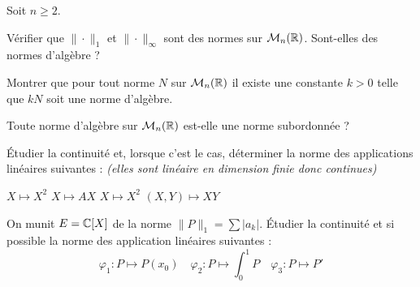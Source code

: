 \documentclass{report}
\begin{document}
\begin{exo}
    Soit \(n\geq 2\).
    \begin{q}{1}
        Vérifier que \(\|\cdot\|_1\) et \(\|\cdot\|_\infty\) sont des normes
        sur \(\mathcal{M}_n(\mathbb{R})\). Sont-elles des normes d'algèbre ?
    \end{q}
    \begin{q}{2}
        Montrer que pour tout norme \(N\) sur \(\mathcal{M}_n(\mathbb{R})\) il existe une
        constante \(k>0\) telle que \(kN\) soit une norme d'algèbre.
    \end{q}
    \begin{q}{3}
        Toute norme d'algèbre sur \(\mathcal{M}_n(\mathbb{R})\) est-elle une norme subordonnée ?
    \end{q}
\end{exo}

\begin{exo}
    Étudier la continuité et, lorsque c'est le cas, déterminer la norme des
    applications linéaires suivantes : \textit{(elles sont linéaire en dimension finie donc continues)}
    \begin{enumerate}
        \itt \(X\mapsto X^2\)
        \itt \(X \mapsto AX\)
        \itt \(X\mapsto X^2\)
        \itt \((X,Y)\mapsto XY\)
    \end{enumerate}
\end{exo}

\begin{exo}
    On munit \(E=\mathbb{C}[X]\) de la norme \(\|P\|_1 = \sum |a_k|\). Étudier la continuité
    et si possible la norme des application linéaires suivantes :
    \[ \varphi_1\colon P \mapsto P(x_0) \quad \varphi_2\colon P \mapsto \int_0^1 P
    \quad \varphi_3\colon P \mapsto P'\]
\end{exo}
\end{document}
